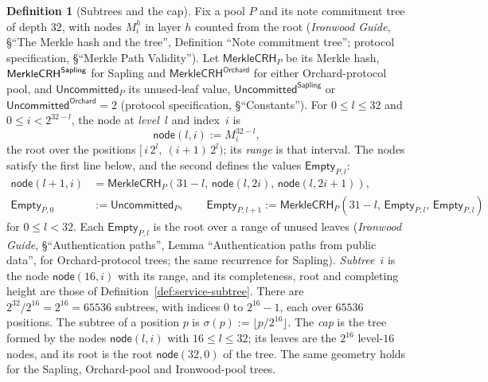\documentclass[11pt,a4paper]{article}
\theoremstyle{definition}
\newtheorem{definition}[theorem]{Definition}
\begin{document}
\begin{definition}[Subtrees and the cap]\label{def:tree-sharded}
Fix a pool $P$ and its note commitment tree of depth $32$, with nodes
$M^h_i$ in layer $h$ counted from the root (\emph{Ironwood Guide},
\S``The Merkle hash and the tree'', Definition ``Note commitment tree'';
protocol specification, \S``Merkle Path Validity''). Let
$\mathsf{MerkleCRH}_P$ be its Merkle hash, $\mathsf{MerkleCRH}^{%
\mathsf{Sapling}}$ for Sapling and $\mathsf{MerkleCRH}^{\mathsf{Orchard}}$
for either Orchard-protocol pool, and $\mathsf{Uncommitted}_P$ its
unused-leaf value, $\mathsf{Uncommitted}^{\mathsf{Sapling}}$ or
$\mathsf{Uncommitted}^{\mathsf{Orchard}} = 2$ (protocol specification,
\S``Constants''). For $0 \le l \le 32$ and $0 \le i < 2^{32-l}$, the node
at \emph{level}~$l$ and index~$i$ is
\[
  \mathsf{node}(l, i) := M^{32-l}_i,
\]
the root over the positions $[\,i\,2^l,\ (i+1)\,2^l)$; its \emph{range} is
that interval. The nodes satisfy the first line below, and the second
defines the values $\mathsf{Empty}_{P,l}$:
\begin{align*}
  \mathsf{node}(l + 1, i) &= \mathsf{MerkleCRH}_P(31 - l,\,
    \mathsf{node}(l, 2i),\, \mathsf{node}(l, 2i + 1)), \\
  \mathsf{Empty}_{P,0} &:= \mathsf{Uncommitted}_P, \qquad
  \mathsf{Empty}_{P,l+1} := \mathsf{MerkleCRH}_P(31 - l,\,
    \mathsf{Empty}_{P,l},\, \mathsf{Empty}_{P,l})
\end{align*}
for $0 \le l < 32$. Each $\mathsf{Empty}_{P,l}$ is the root over a range
of unused leaves (\emph{Ironwood Guide}, \S``Authentication paths'', Lemma
``Authentication paths from public data'', for Orchard-protocol trees; the
same recurrence for Sapling). \emph{Subtree}~$i$ is the node
$\mathsf{node}(16, i)$ with its range, and its completeness, root and
completing height are those of Definition~\ref{def:service-subtree}. There
are $2^{32}/2^{16} = 2^{16} = 65536$ subtrees, with indices $0$ to
$2^{16} - 1$, each over $65536$ positions. The subtree of a position $p$ is
$\sigma(p) := \lfloor p / 2^{16} \rfloor$. The \emph{cap} is the tree
formed by the nodes $\mathsf{node}(l, i)$ with $16 \le l \le 32$; its leaves
are the $2^{16}$ level-$16$ nodes, and its root is the root
$\mathsf{node}(32, 0)$ of the tree. The same geometry holds for the
Sapling, Orchard-pool and Ironwood-pool trees.
\end{definition}
\end{document}
